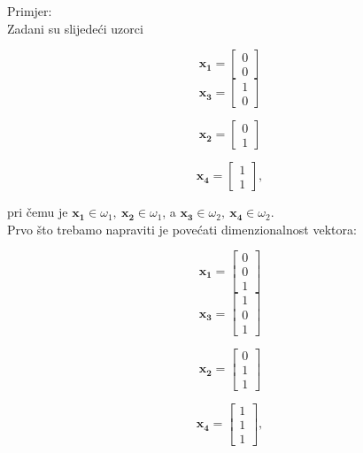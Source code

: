 \documentclass{book}
\begin{document}
\begin{shaded}
Primjer: \\

Zadani su slijedeći uzorci
\begin{figure}[H]
\begin{minipage}[b]{0.5\textwidth}
$$ \mathbf{x_1} = \begin{bmatrix}
0 \\
0
\end{bmatrix} $$
$$ \mathbf{x_3} = \begin{bmatrix}
1 \\
0
\end{bmatrix} $$
\end{minipage}
\begin{minipage}[b]{0.5\textwidth}
$$ \mathbf{x_2} = \begin{bmatrix}
0 \\
1
\end{bmatrix}$$

$$ \mathbf{x_4} = \begin{bmatrix}
1 \\
1
\end{bmatrix}, $$
\end{minipage}
\end{figure}

pri čemu je $\mathbf{x_1} \in \omega_1, \ \mathbf{x_2} \in \omega_1$, a
$\mathbf{x_3} \in \omega_2, \ \mathbf{x_4} \in \omega_2$. \\

Prvo što trebamo napraviti je povećati dimenzionalnost vektora:
\begin{figure}[H]
\begin{minipage}[b]{0.5\textwidth}
$$ \mathbf{x_1} = \begin{bmatrix}
0 \\
0 \\
1
\end{bmatrix} $$
$$ \mathbf{x_3} = \begin{bmatrix}
1 \\
0 \\ 
1
\end{bmatrix} $$
\end{minipage}
\begin{minipage}[b]{0.5\textwidth}
$$ \mathbf{x_2} = \begin{bmatrix}
0 \\
1 \\
1
\end{bmatrix}$$

$$ \mathbf{x_4} = \begin{bmatrix}
1 \\
1 \\
1
\end{bmatrix}, $$
\end{minipage}
\end{figure}


\end{shaded}
\end{document}
